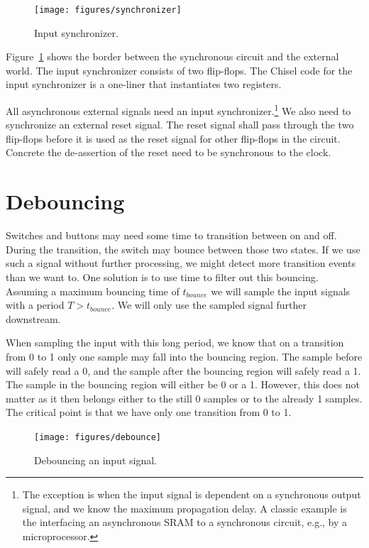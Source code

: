 \documentclass[%
    10pt,
    headinclude, footexclude,
    openright, %
    notitlepage,
    cleardoubleempty,
    headsepline,
    pointlessnumbers,
    bibtotoc, idxtotoc,
    ]{scrbook}
\begin{document}
\begin{figure}
  \centering
  \texttt{[image: figures/synchronizer]}
  \caption{Input synchronizer.}
  \label{fig:synchronizer}
\end{figure}

Figure~\ref{fig:synchronizer} shows the border between the synchronous
circuit and the external world. The input synchronizer consists of
two flip-flops. The Chisel code for the input synchronizer is a one-liner that
instantiates two registers.


All asynchronous external signals need an input
synchronizer.\footnote{The exception is when the input signal is dependent
on a synchronous output signal, and we know the maximum propagation delay.
A classic example is the interfacing an asynchronous SRAM
to a synchronous circuit, e.g., by a microprocessor.}
We also need to synchronize an external reset signal. The reset signal
shall pass through the two flip-flops before it is used as the reset signal
for other flip-flops in the circuit. Concrete the de-assertion of the reset need
to be synchronous to the clock.

\section{Debouncing}

Switches and buttons may need some time to transition between on and off.
During the transition, the switch may bounce between those two states.
If we use such a signal without further processing, we might detect more
transition events than we want to. One solution is to use time to filter out
this bouncing. Assuming a maximum bouncing time of $t_{bounce}$ we will sample the
input signals with a period $T > t_{bounce}$. We will only use the
sampled signal further downstream.

When sampling the input with this long period, we know that on a transition
from 0 to 1 only one sample may fall into the bouncing region.
The sample before will safely read a 0, and the sample after the bouncing
region will safely read a 1. The sample in the bouncing region will
either be  0 or a 1. However, this does not matter as it then belongs either
to the still 0 samples or to the already 1 samples. The critical point
is that we have only one transition from 0 to 1.

\begin{figure}
  \centering
  \texttt{[image: figures/debounce]}
  \caption{Debouncing an input signal.}
  \label{fig:debounce}
\end{figure}
\end{document}
